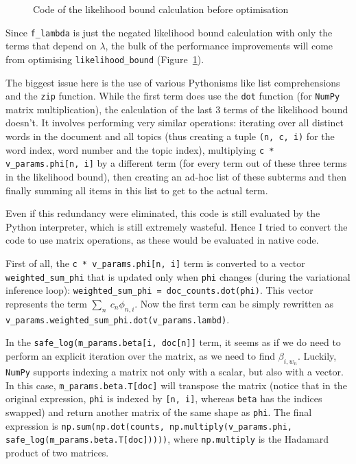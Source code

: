 \documentclass[12pt,a4paper,twoside,openright]{report}
\begin{document}
\begin{figure}
\caption{Code of the likelihood bound calculation before optimisation}
\label{fig:code-before-optimisation}
\end{figure}

Since \texttt{f\_lambda} is just the negated likelihood bound calculation with only the terms that depend on $\lambda$, the bulk of the performance improvements will come from optimising \texttt{likelihood\_bound} (Figure~\ref{fig:code-before-optimisation}).

The biggest issue here is the use of various Pythonisms like list comprehensions and the \texttt{zip} function. While the first term does use the \texttt{dot} function (for \texttt{NumPy} matrix multiplication), the calculation of the last 3 terms of the likelihood bound doesn't. It involves performing very similar operations: iterating over all distinct words in the document and all topics (thus creating a tuple \texttt{(n, c, i)} for the word index, word number and the topic index), multiplying \texttt{c * v\_params.phi[n, i]} by a different term (for every term out of these three terms in the likelihood bound), then creating an ad-hoc list of these subterms and then finally summing all items in this list to get to the actual term.

Even if this redundancy were eliminated, this code is still evaluated by the Python interpreter, which is still extremely wasteful. Hence I tried to convert the code to use matrix operations, as these would be evaluated in native code.

First of all, the \texttt{c * v\_params.phi[n, i]} term is converted to a vector \texttt{weighted\_sum\_phi} that is updated only when \texttt{phi} changes (during the variational inference loop): \texttt{weighted\_sum\_phi = doc\_counts.dot(phi)}. This vector represents the term $\sum\limits_n\ c_n\phi_{n, i}$. Now the first term can be simply rewritten as \texttt{v\_params.weighted\_sum\_phi.dot(v\_params.lambd)}.

In the \texttt{safe\_log(m\_params.beta[i, doc[n]]} term, it seems as if we do need to perform an explicit iteration over the matrix, as we need to find $\beta_{i, w_n}$. Luckily, \texttt{NumPy} supports indexing a matrix not only with a scalar, but also with a vector. In this case, \texttt{m\_params.beta.T[doc]} will transpose the matrix (notice that in the original expression, \texttt{phi} is indexed by \texttt{[n, i]}, whereas \texttt{beta} has the indices swapped) and return another matrix of the same shape as \texttt{phi}. The final expression is \texttt{np.sum(np.dot(counts, np.multiply(v\_params.phi, safe\_log(m\_params.beta.T[doc]))))}, where \texttt{np.multiply} is the Hadamard product of two matrices.
\end{document}
